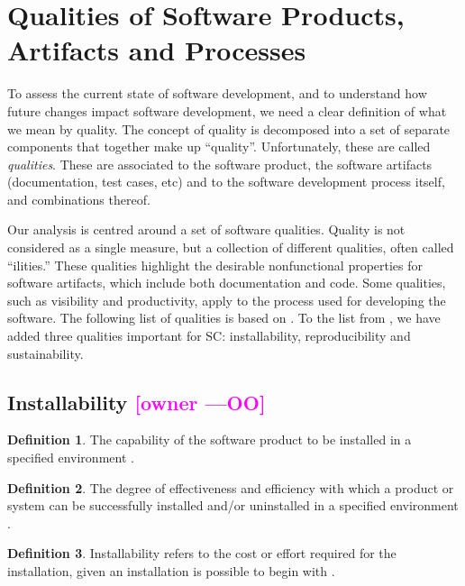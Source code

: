 \documentclass[letterpaper,cleveref]{lipics-v2019}
\newcommand{\authornote}[3]{\textcolor{#1}{[#3 ---#2]}}
\newcommand{\authornote}[3]{}
\newcommand{\oo}[1]{\authornote{magenta}{OO}{#1}} %
\theoremstyle{definition}
\newtheorem{defn}{Definition}
\begin{document}
\section{Qualities of Software Products, Artifacts and
	Processes} \label{SecQualities}

To assess the current state of software development, and to understand how
future changes impact software development, we need a clear definition of what
we mean by quality.  The concept of quality is decomposed into a set of separate
components that together make up ``quality''. Unfortunately, these are
called \emph{qualities}. These are associated to the software product,
the software artifacts (documentation, test cases, etc) and to the software
development process itself, and combinations thereof.

Our analysis is centred around a set of software qualities.  Quality is not
considered as a single measure, but a collection of different qualities, often
called ``ilities.''  These qualities highlight the desirable nonfunctional
properties for software artifacts, which include both documentation and
code. Some qualities, such as visibility and productivity, apply to the process
used for developing the software. The following list of qualities is based on
\cite{GhezziEtAl2003}. To the list from \cite{GhezziEtAl2003}, we have added
three qualities important for SC: installability, reproducibility and
sustainability.

\subsection{{Installability} \oo{owner}}

\begin{defn}
  The capability of the software product to be installed in a specified
  environment \citep{ISO9126}.
\end{defn}

\begin{defn} \label{Installability_Selected2}
	The degree of effectiveness and efficiency with which a product or system can
	be successfully installed and/or uninstalled in a specified environment
	\citep{ISO/IEC25010}.
\end{defn}

\begin{defn} \label{Installability_Selected1} Installability refers to the cost
  or effort required for the installation, given an installation is possible to
  begin with \citep{lenhard2013measuring}.
\end{defn}
\end{document}
